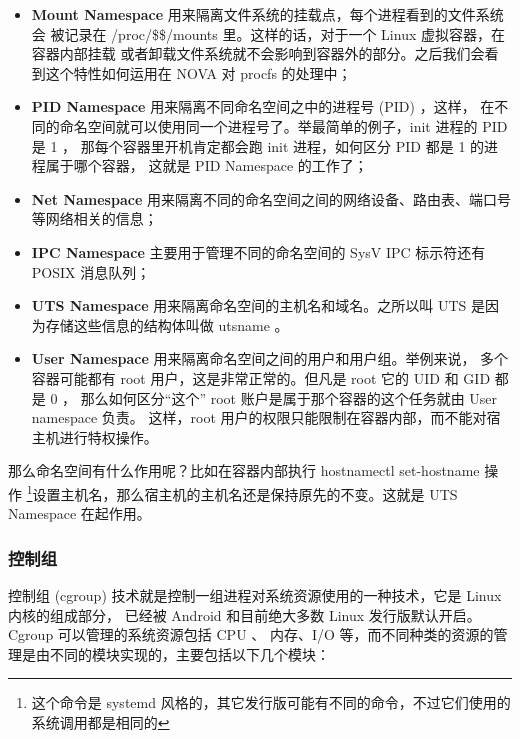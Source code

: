 \begin{itemize}
    \item \textbf{Mount Namespace} 用来隔离文件系统的挂载点，每个进程看到的文件系统会
    被记录在 /proc/\$\$/mounts 里。这样的话，对于一个 Linux 虚拟容器，在容器内部挂载
    或者卸载文件系统就不会影响到容器外的部分。之后我们会看到这个特性如何运用在 NOVA 对
    procfs 的处理中；
    \item \textbf{PID Namespace} 用来隔离不同命名空间之中的进程号 (PID) ，这样，
    在不同的命名空间就可以使用同一个进程号了。举最简单的例子，init 进程的 PID 是 1 ，
    那每个容器里开机肯定都会跑 init 进程，如何区分 PID 都是 1 的进程属于哪个容器，
    这就是 PID Namespace 的工作了；
    \item \textbf{Net Namespace} 用来隔离不同的命名空间之间的网络设备、路由表、端口号
    等网络相关的信息；
    \item \textbf{IPC Namespace} 主要用于管理不同的命名空间的 SysV IPC 标示符还有
    POSIX 消息队列；
    \item \textbf{UTS Namespace} 用来隔离命名空间的主机名和域名。之所以叫 UTS
    是因为存储这些信息的结构体叫做 utsname 。
    \item \textbf{User Namespace} 用来隔离命名空间之间的用户和用户组。举例来说，
    多个容器可能都有 root 用户，这是非常正常的。但凡是 root 它的 UID 和 GID 都是 0 ，
    那么如何区分“这个” root 账户是属于那个容器的这个任务就由 User namespace 负责。
    这样，root 用户的权限只能限制在容器内部，而不能对宿主机进行特权操作。
\end{itemize}

那么命名空间有什么作用呢？比如在容器内部执行 hostnamectl set-hostname 操作
\footnote{这个命令是 systemd 风格的，其它发行版可能有不同的命令，不过它们使用的
系统调用都是相同的}设置主机名，那么宿主机的主机名还是保持原先的不变。这就是 UTS Namespace
在起作用。

\subsubsection{控制组}

控制组 (cgroup) 技术就是控制一组进程对系统资源使用的一种技术，它是 Linux 内核的组成部分，
已经被 Android 和目前绝大多数 Linux 发行版默认开启。Cgroup 可以管理的系统资源包括 CPU 、
内存、I/O 等，而不同种类的资源的管理是由不同的模块实现的，主要包括以下几个模块：

